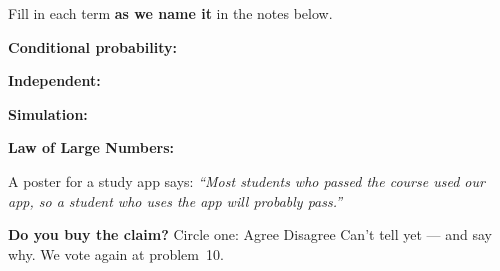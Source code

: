 \documentclass[12pt]{article}
\newcommand{\termrowheight}{2.3cm}
\newlength{\termrowinset}\setlength{\termrowinset}{7pt}
\newcommand{\vterm}[1]{%
  \par\noindent\begin{minipage}[t][\termrowheight][t]{\linewidth}%
    \vspace*{\termrowinset}%
    \textbf{\textcolor{cerulean}{#1:}}%
  \end{minipage}\par}
\begin{document}

\vspace{0.15in}

\boxguard[16]
\begin{vocabbox}
\small
Fill in each term \textbf{as we name it} in the notes below.
\vterm{Conditional probability}
\vterm{Independent}
\vterm{Simulation}
\vterm{Law of Large Numbers}
\end{vocabbox}

\boxguard[12]
\begin{hookbox}
\small
A poster for a study app says: \emph{``Most students who passed the course used our app, so a
student who uses the app will probably pass.''}

\vspace{3pt}
\textbf{Do you buy the claim?} Circle one: \quad Agree \qquad Disagree \qquad Can't tell yet \quad
--- and say why. We vote again at problem~10.
\par{}
\end{hookbox}
\end{document}
